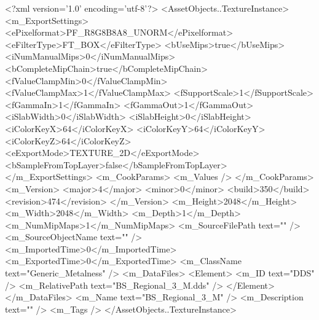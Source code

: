 <?xml version='1.0' encoding='utf-8'?>
<AssetObjects..TextureInstance>
  <m_ExportSettings>
    <ePixelformat>PF_R8G8B8A8_UNORM</ePixelformat>
    <eFilterType>FT_BOX</eFilterType>
    <bUseMips>true</bUseMips>
    <iNumManualMips>0</iNumManualMips>
    <bCompleteMipChain>true</bCompleteMipChain>
    <fValueClampMin>0</fValueClampMin>
    <fValueClampMax>1</fValueClampMax>
    <fSupportScale>1</fSupportScale>
    <fGammaIn>1</fGammaIn>
    <fGammaOut>1</fGammaOut>
    <iSlabWidth>0</iSlabWidth>
    <iSlabHeight>0</iSlabHeight>
    <iColorKeyX>64</iColorKeyX>
    <iColorKeyY>64</iColorKeyY>
    <iColorKeyZ>64</iColorKeyZ>
    <eExportMode>TEXTURE_2D</eExportMode>
    <bSampleFromTopLayer>false</bSampleFromTopLayer>
  </m_ExportSettings>
  <m_CookParams>
    <m_Values />
  </m_CookParams>
  <m_Version>
    <major>4</major>
    <minor>0</minor>
    <build>350</build>
    <revision>474</revision>
  </m_Version>
  <m_Height>2048</m_Height>
  <m_Width>2048</m_Width>
  <m_Depth>1</m_Depth>
  <m_NumMipMaps>1</m_NumMipMaps>
  <m_SourceFilePath text="" />
  <m_SourceObjectName text="" />
  <m_ImportedTime>0</m_ImportedTime>
  <m_ExportedTime>0</m_ExportedTime>
  <m_ClassName text="Generic_Metalness" />
  <m_DataFiles>
    <Element>
      <m_ID text="DDS" />
      <m_RelativePath text="BS_Regional_3_M.dds" />
    </Element>
  </m_DataFiles>
  <m_Name text="BS_Regional_3_M" />
  <m_Description text="" />
  <m_Tags />
</AssetObjects..TextureInstance>